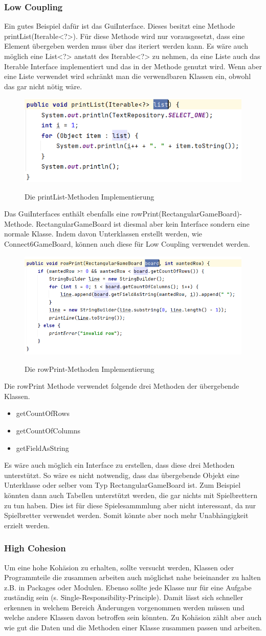\documentclass[12pt]{article}
\newcommand{\PrintList}{\includegraphics[width=15cm]{Bilder/printList}}
\newcommand{\RowPrint}{\includegraphics[width=15cm]{Bilder/rowPrint}}
\begin{document}
\subsubsection{Low Coupling}
Ein gutes Beispiel dafür ist das GuiInterface. Dieses besitzt eine Methode printList(Iterable<?>). Für diese Methode wird nur vorausgesetzt, dass eine Element übergeben werden muss über das iteriert werden kann. Es wäre auch möglich eine List<?> anstatt des Iterable<?> zu nehmen, da eine Liste auch das Iterable Interface implementiert und das in der Methode genutzt wird. Wenn aber eine Liste verwendet wird schränkt man die verwendbaren Klassen ein, obwohl das gar nicht nötig wäre.
\\

\begin{figure}[H]
\centering
{\PrintList}
\caption{Die printList-Methoden Implementierung}
\label{fig:printList}
\end{figure}


Das GuiInterfaces enthält ebenfalls eine rowPrint(RectangularGameBoard)-Methode. RectangularGameBoard ist diesmal aber kein Interface sondern eine normale Klasse. Indem davon Unterklassen erstellt werden, wie Connect6GameBoard, können auch diese für Low Coupling verwendet werden. 
\\

\begin{figure}[H]
\centering
{\RowPrint}
\caption{Die rowPrint-Methoden Implementierung}
\label{fig:rowPrint}
\end{figure}

Die rowPrint Methode verwendet folgende drei Methoden der übergebende Klassen.
\begin{itemize}
\item getCountOfRows
\item getCountOfColumns
\item getFieldAsString
\end{itemize}

Es wäre auch möglich ein Interface zu erstellen, dass diese drei Methoden unterstützt. So wäre es nicht notwendig, dass das übergebende Objekt eine Unterklasse oder selber vom Typ RectangularGameBoard ist. Zum Beispiel könnten dann auch Tabellen unterstützt werden, die gar nichts mit Spielbrettern zu tun haben. Dies ist für diese Spielesammmlung aber nicht interessant, da nur Spielbretter verwendet werden. Somit könnte aber noch mehr Unabhängigkeit erzielt werden.



\newpage
\subsubsection{High Cohesion}
Um eine hohe Kohäsion zu erhalten, sollte versucht werden, Klassen oder Programmteile die zusammen arbeiten auch möglichst nahe beieinander zu halten z.B. in Packages oder Modulen. Ebenso sollte jede Klasse nur für eine Aufgabe zuständig sein (s. Single-Responsibility-Principle). Damit lässt sich schneller erkennen in welchem Bereich Änderungen vorgenommen werden müssen und welche andere Klassen davon betroffen sein könnten. Zu Kohäsion zählt aber auch wie gut die Daten und die Methoden einer Klasse zusammen passen und arbeiten.
\end{document}
